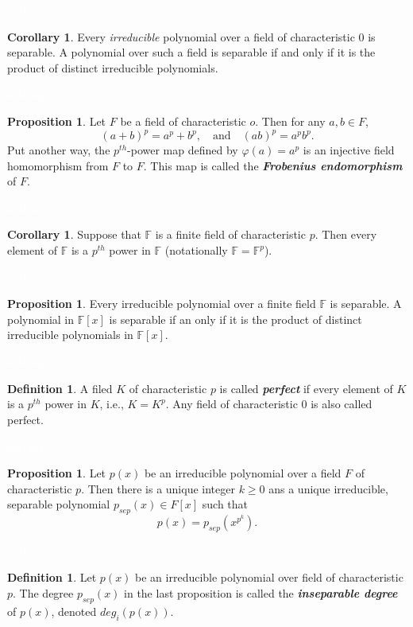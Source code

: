 \documentclass{article}
\theoremstyle{definition}
\newtheorem{prop}[thm]{Proposition}
\newtheorem{cor}[thm]{Corollary}
\newtheorem{defn}[thm]{Definition}
\newcommand{\nl}{\textcolor{white}{nothing}}
\newcommand{\F}{\mathbb{F}}
\newcommand{\vphi}{\varphi}
\begin{document}
\nl

\begin{cor}
Every \textit{irreducible} polynomial over a field of characteristic 0 is separable. A polynomial over such a field is separable if and only if it is the product of distinct irreducible polynomials.
\end{cor}

\nl

\begin{prop}
Let $F$ be a field of characteristic $o$. Then for any $a,b\in F$,
\[(a + b)^p = a^p + b^p,\quad\text{and}\quad(ab)^p = a^pb^p.\]
Put another way, the $p^{th}$-power map defined by $\vphi(a) = a^p$ is an injective field homomorphism from $F$ to $F$. This map is called the \textit{\textbf{Frobenius endomorphism}} of $F$.
\end{prop}

\nl

\begin{cor}
Suppose that $\F$ is a finite field of characteristic $p$. Then every element of $\F$ is a $p^{th}$ power in $\F$ (notationally $\F = \F^p$).
\end{cor}

\nl

\begin{prop}
Every irreducible polynomial over a finite field $\F$ is separable. A polynomial in $\F[x]$ is separable if an only if it is the product of distinct irreducible polynomials in $\F[x]$.
\end{prop}

\nl

\begin{defn}
A filed $K$ of characteristic $p$ is called \textit{\textbf{perfect}} if every element of $K$ is a $p^{th}$ power in $K$, i.e., $K = K^p$. Any field of characteristic 0 is also called perfect.
\end{defn}

\nl

\begin{prop}
Let $p(x)$ be an irreducible polynomial over a field $F$ of characteristic $p$. Then there is a unique integer $k\geq 0$ ans a unique irreducible, separable polynomial $p_{sep}(x)\in F[x]$ such that
\[p(x) = p_{sep}(x^{p^k}). \]
\end{prop}

\nl

\begin{defn}
Let $p(x)$ be an irreducible polynomial over field of characteristic $p$. The degree $p_{sep}(x)$ in the last proposition is called the \textit{\textbf{inseparable degree}} of $p(x)$, denoted $deg_i(p(x))$.
\end{defn}
\end{document}
